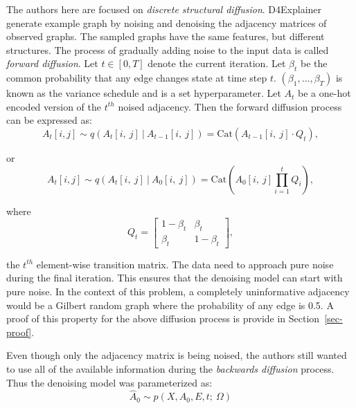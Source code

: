 \documentclass[
  11pt,
  letterpaper,
]{article}
\begin{document}
\quad The authors here are focused on \emph{discrete structural
diffusion}. D4Explainer generate example graph by noising and denoising
the adjacency matrices of observed graphs. The sampled graphs have the
same features, but different structures. The process of gradually adding
noise to the input data is called \emph{forward diffusion}. Let
\(t \in [0, T]\) denote the current iteration. Let \(\beta_t\) be the
common probability that any edge changes state at time step \(t\).
\((\beta_1, \dots, \beta_T)\) is known as the variance schedule and is a
set hyperparameter. Let \(A_t\) be a one-hot encoded version of the
\(t^{th}\) noised adjacency. Then the forward diffusion process can be
expressed as:\\
\begin{equation}
        A_t[i, j] \sim q(A_t[i, \ j] \ | \ A_{t-1}[i, \ j]) 
        = \text{Cat}(A_{t-1}[i, \ j] \cdot Q_t), 
\end{equation}

or \begin{equation} \label{eq-forward-diff}
        A_t[i, j] \sim q(A_t[i, \ j] \ | \ A_{0}[i, \ j]) 
        = \text{Cat}\left(A_0[i, \ j] \prod_{i=1}^t  Q_i \right), 
\end{equation}

where \[
Q_t = 
\left[
\begin{matrix}
    1-\beta_t & \beta_t \\ 
    \beta_t & 1 - \beta_t
\end{matrix}
\right], 
\]

the \(t^{th}\) element-wise transition matrix. The data need to approach
pure noise during the final iteration. This ensures that the denoising
model can start with pure noise. In the context of this problem, a
completely uninformative adjacency would be a Gilbert random graph where
the probability of any edge is 0.5. A proof of this property for the
above diffusion process is provide in Section~\ref{sec-proof}.

\quad Even though only the adjacency matrix is being noised, the authors
still wanted to use all of the available information during the
\emph{backwards diffusion} process. Thus the denoising model was
parameterized as: \begin{equation}
    \hat A_0 \sim p(X, A_0, E, t; \ \Omega)
\end{equation}
\end{document}
